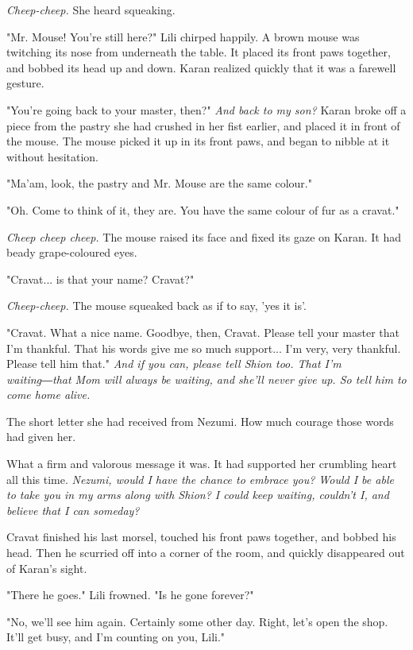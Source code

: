 \emph{Cheep-cheep.} She heard squeaking.

"Mr. Mouse! You're still here?" Lili chirped happily. A brown mouse was
twitching its nose from underneath the table. It placed its front paws
together, and bobbed its head up and down. Karan realized quickly that
it was a farewell gesture.

"You're going back to your master, then?" \emph{And back to my son?} Karan
broke off a piece from the pastry she had crushed in her fist earlier,
and placed it in front of the mouse. The mouse picked it up in its front
paws, and began to nibble at it without hesitation.

"Ma'am, look, the pastry and Mr. Mouse are the same colour."

"Oh. Come to think of it, they are. You have the same colour of fur as a
cravat."

\emph{Cheep cheep cheep.} The mouse raised its face and fixed its gaze on
Karan. It had beady grape-coloured eyes.

"Cravat... is that your name? Cravat?"

\emph{Cheep-cheep.} The mouse squeaked back as if to say, 'yes it is'.

"Cravat. What a nice name. Goodbye, then, Cravat. Please tell your
master that I'm thankful. That his words give me so much support... I'm
very, very thankful. Please tell him that." \emph{And if you can, please tell
Shion too. That I'm waiting―that Mom will always be waiting, and she'll
never give up. So tell him to come home alive.}


The short letter she had received from Nezumi. How much courage those
words had given her.


What a firm and valorous message it was. It had supported her crumbling
heart all this time. \emph{Nezumi, would I have the chance to embrace you?
Would I be able to take you in my arms along with Shion? I could keep
waiting, couldn't I, and believe that I can someday?}

Cravat finished his last morsel, touched his front paws together, and
bobbed his head. Then he scurried off into a corner of the room, and
quickly disappeared out of Karan's sight.

"There he goes." Lili frowned. "Is he gone forever?"

"No, we'll see him again. Certainly some other day. Right, let's open
the shop. It'll get busy, and I'm counting on you, Lili."

